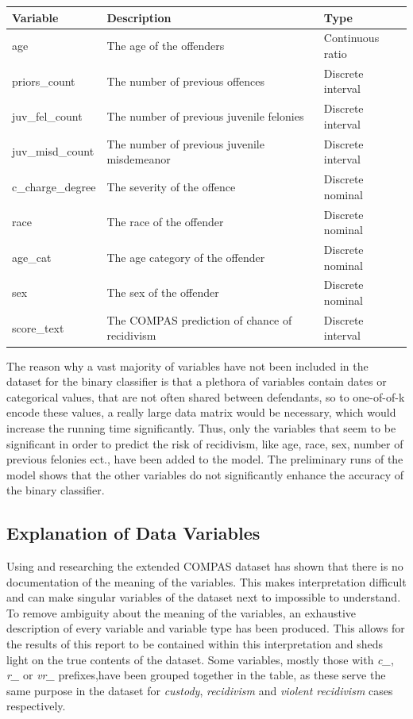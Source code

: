 \documentclass[11pt, fleqn, titlepage]{article}
\begin{document}
	
	\begin{table}[H]\label{resultater}
		\centering
		\begin{tabular}{l l l}
			Variable & Description & Type \\ \hline
			age & The age of the offenders & Continuous ratio \\
			priors\_count & The number of previous offences & Discrete interval \\
			juv\_fel\_count & The number of previous juvenile felonies & Discrete interval \\
			juv\_misd\_count & The number of previous juvenile misdemeanor & Discrete interval \\
			c\_charge\_degree & The severity of the offence & Discrete nominal \\
			race & The race of the offender & Discrete nominal \\
			age\_cat & The age category of the offender & Discrete nominal \\
			sex & The sex of the offender & Discrete nominal \\
			score\_text & The COMPAS prediction of chance of recidivism & Discrete interval
		\end{tabular}
	\end{table} \noindent
	The reason why a vast majority of variables have not been included in the dataset for the binary classifier is that a plethora of variables contain dates or categorical values, that are not often shared between defendants, so to one-of-of-k encode these values, a really large data matrix would be necessary, which would increase the running time significantly. Thus, only the variables that seem to be significant in order to predict the risk of recidivism, like age, race, sex, number of previous felonies ect., have been added to the model. The preliminary runs of the model shows that the other variables do not significantly enhance the accuracy of the binary classifier.
		
		
	\subsection{Explanation of Data Variables} \label{dataExamination}
	Using and researching the extended COMPAS dataset has shown that there is no documentation of the meaning of the variables. This makes interpretation difficult and can make singular variables of the dataset next to impossible to understand. To remove ambiguity about the meaning of the variables, an exhaustive description of every variable and variable type has been produced. This allows for the results of this report to be contained within this interpretation and sheds light on the true contents of the dataset. Some variables, mostly those with \textit{c\_}, \textit{r\_} or \textit{vr\_} prefixes,have been grouped together in the table, as these serve the same purpose in the dataset for \textit{custody}, \textit{recidivism} and \textit{violent recidivism} cases respectively. 
	
\end{document}
